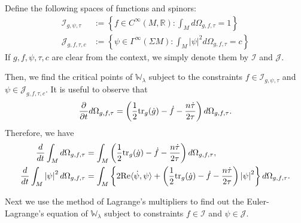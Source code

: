 \documentclass{amsart}
\theoremstyle{definition}
\theoremstyle{remark}
\numberwithin{equation}{section}
\newcommand{\abs}[1]{\left|#1\right|}
\newcommand{\tr}{\textup{tr}}
\newcommand{\R}{\mathbb{R}}
\newcommand{\D}[2]{\frac{\partial #1}{\partial #2}}
\begin{document}
Define the following spaces of functions and spinors:
\begin{align*}
\mathcal{I}_{g,\psi,\tau} & := \left\{f \in C^\infty(M,\R) : \int_M d\Omega_{g,f,\tau} = 1\right\}	\\
\mathcal{J}_{g,f,\tau,c} & := \left\{\psi \in \Gamma^\infty(\Sigma M) : \int_M \abs{\psi}^2 d\Omega_{g,f,\tau} = c\right\}
\end{align*}
If $g,f,\psi,\tau,c$ are clear from the context, we simply denote them by $\mathcal{I}$ and $\mathcal{J}$.

Then, we find the critical points of $\mathbb{W}_\lambda$ subject to the constraints $f \in \mathcal{I}_{g,\psi,\tau}$ and $\psi \in \mathcal{J}_{g,f,\tau,c}$. It is useful to observe that
\begin{equation}
\label{eq:dOmega/dt}
\D{}{t}d\Omega_{g,f,\tau} = \left(\frac{1}{2}\tr_g(\dot{g}) - \dot{f} - \frac{n\dot\tau}{2\tau}\right)d\Omega_{g,f,\tau}.
\end{equation}
Therefore, we have
\begin{align}
\label{eq:dI/dt}
\frac{d}{dt}\int_M d\Omega_{g,f,\tau} & = \int_M \left(\frac{1}{2}\tr_g(\dot{g}) - \dot{f} - \frac{n\dot\tau}{2\tau}\right)d\Omega_{g,f,\tau},\\
\label{eq:dJ/dt}
\frac{d}{dt}\int_M \abs{\psi}^2 d\Omega_{g,f,\tau} & = \int_M \left\{2\textup{Re}\langle \dot\psi, \psi\rangle + \left(\frac{1}{2}\tr_g(\dot{g}) - \dot{f} - \frac{n\dot\tau}{2\tau}\right)\abs{\psi}^2\right\}d\Omega_{g,f,\tau}.
\end{align}

Next we use the method of Lagrange's multipliers to find out the Euler-Lagrange's equation of $\mathbb{W}_\lambda$ subject to constraints $f \in \mathcal{I}$ and $\psi \in \mathcal{J}$.
\end{document}
